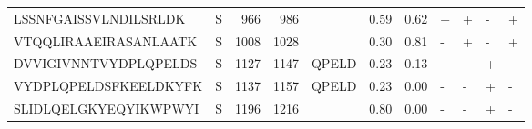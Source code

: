 \begin{tabular}{llrrlrrllll}
LSSNFGAISSVLNDILSRLDK &       S &    966 &   986 &                    &            0.59 &             0.62 &      + &       + &      - &       + \\
VTQQLIRAAEIRASANLAATK &       S &   1008 &  1028 &                    &            0.30 &             0.81 &      - &       + &      - &       + \\
DVVIGIVNNTVYDPLQPELDS &       S &   1127 &  1147 &              QPELD &            0.23 &             0.13 &      - &       - &      + &       - \\
VYDPLQPELDSFKEELDKYFK &       S &   1137 &  1157 &              QPELD &            0.23 &             0.00 &      - &       - &      + &       - \\
SLIDLQELGKYEQYIKWPWYI &       S &   1196 &  1216 &                    &            0.80 &             0.00 &      - &       - &      + &       - \\
\bottomrule
\end{tabular}

